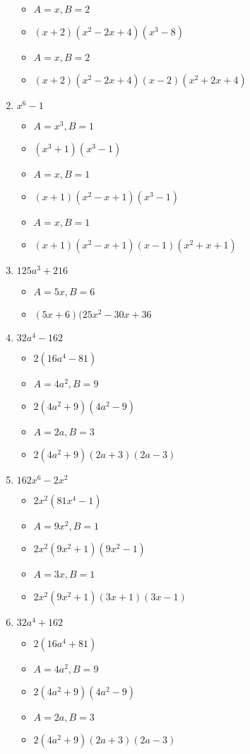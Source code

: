 \documentclass{article}
\begin{document}
\begin{enumerate}
\begin{itemize}
  \item $A=x, B=2$
  \item $(x+2)(x^{2}-2x+4)(x^{3}-8)$
  \item $A=x, B=2$
  \item $(x+2)(x^{2}-2x+4)(x-2)(x^{2}+2x+4)$
  \end{itemize}
\item $x^{6} - 1$
  \begin{itemize}
  \item $A=x^{3}, B=1$
  \item $(x^{3}+1)(x^{3}-1)$
  \item $A=x, B=1$
  \item $(x+1)(x^{2}-x+1)(x^{3}-1)$
  \item $A=x, B=1$
  \item $(x+1)(x^{2}-x+1)(x-1)(x^{2}+x+1)$
  \end{itemize}
\item $125a^{3} + 216$
  \begin{itemize}
  \item $A=5x, B=6$
  \item $(5x+6)(25x^{2}-30x+36$
  \end{itemize}
\item $32a^{4} - 162$
  \begin{itemize}
  \item $2(16a^{4}-81)$
  \item $A=4a^{2}, B=9$
  \item $2(4a^{2}+9)(4a^{2}-9)$
  \item $A=2a, B=3$
  \item $2(4a^{2}+9)(2a+3)(2a-3)$
  \end{itemize}
\item $162x^{6} -2x^{2}$
  \begin{itemize}
  \item $2x^{2}(81x^{4}-1)$
  \item $A=9x^{2}, B=1$
  \item $2x^{2}(9x^{2}+1)(9x^{2}-1)$
  \item $A=3x, B=1$
  \item $2x^{2}(9x^{2}+1)(3x+1)(3x-1)$
  \end{itemize}
\item $32a^{4} + 162$
  \begin{itemize}
  \item $2(16a^{4}+81)$
  \item $A=4a^{2}, B=9$
  \item $2(4a^{2}+9)(4a^{2}-9)$
  \item $A=2a, B=3$
  \item $2(4a^{2}+9)(2a+3)(2a-3)$
  \end{itemize}
\end{enumerate}
\end{document}
